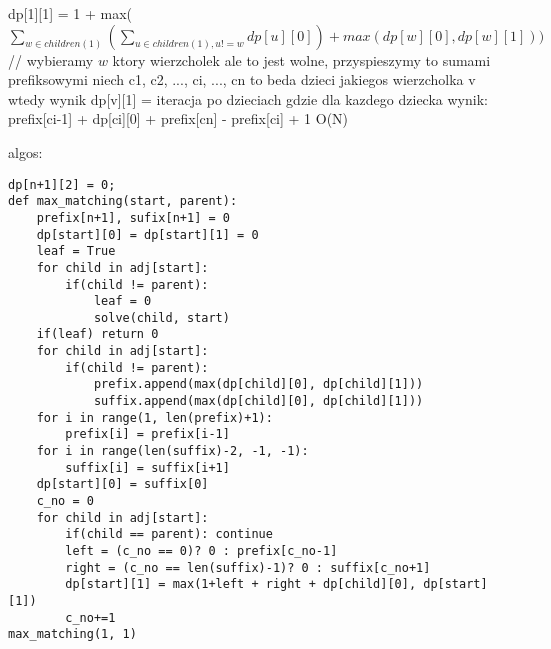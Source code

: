 \documentclass[12pt]{article}
\begin{document}
dp[1][1] = 1 + max($\sum_{w \in children(1)} (\sum_{u \in children(1), u != w} dp[u][0]) + max(dp[w][0], dp[w][1]))$ // wybieramy $w$ ktory wierzcholek 
ale to jest wolne, przyspieszymy to sumami prefiksowymi 
niech c1, c2, ..., ci, ..., cn to beda dzieci jakiegos wierzcholka v 
wtedy wynik dp[v][1] = iteracja po dzieciach gdzie dla kazdego dziecka wynik: prefix[ci-1] + dp[ci][0] + prefix[cn] - prefix[ci] + 1
O(N)

algos:
\begin{lstlisting}
dp[n+1][2] = 0;
def max_matching(start, parent):
    prefix[n+1], sufix[n+1] = 0
    dp[start][0] = dp[start][1] = 0
    leaf = True 
    for child in adj[start]:
        if(child != parent):
            leaf = 0
            solve(child, start)
    if(leaf) return 0
    for child in adj[start]:
        if(child != parent):
            prefix.append(max(dp[child][0], dp[child][1]))
            suffix.append(max(dp[child][0], dp[child][1]))
    for i in range(1, len(prefix)+1):
        prefix[i] = prefix[i-1]
    for i in range(len(suffix)-2, -1, -1):
        suffix[i] = suffix[i+1]
    dp[start][0] = suffix[0]
    c_no = 0
    for child in adj[start]:
        if(child == parent): continue 
        left = (c_no == 0)? 0 : prefix[c_no-1]
        right = (c_no == len(suffix)-1)? 0 : suffix[c_no+1]
        dp[start][1] = max(1+left + right + dp[child][0], dp[start][1])
        c_no+=1
max_matching(1, 1)   
\end{lstlisting}

\egroup
\end{document}
